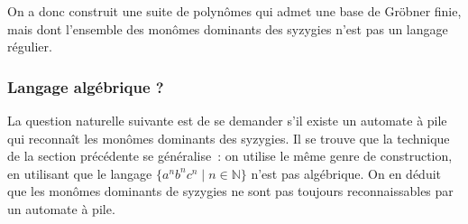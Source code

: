 \documentclass{article}
\newcommand{\N}{\mathbb{N}}
\begin{document}
On a donc construit une suite de polynômes qui admet une base de Gröbner finie, mais dont l'ensemble des monômes dominants des syzygies n'est pas un langage régulier.

\subsubsection*{Langage algébrique ?}

La question naturelle suivante est de se demander s'il existe un automate à pile qui reconnaît les monômes dominants des syzygies.
Il se trouve que la technique de la section précédente se généralise~: on utilise le même genre de construction, en utilisant que le langage $\{a^nb^nc^n \;|\; n \in \N\}$ n'est pas algébrique.
On en déduit que les monômes dominants de syzygies ne sont pas toujours reconnaissables par un automate à pile.

\nocite{*}
\printbibliography
\end{document}
